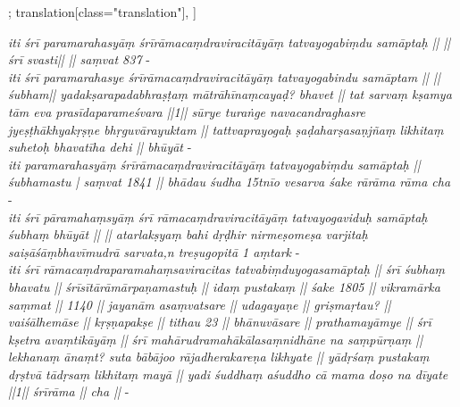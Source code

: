 \begin{alignment}[
  texts=edition[class="edition"];
  translation[class="translation"],
  ]
\begin{edition}
\begin{prose}[p58_05]
{\textit{iti śrī paramarahasyāṃ śrīrāmacaṃdraviracitāyāṃ tatvayogabiṃdu samāptaḥ || || śrī svasti||  || saṃvat 837} - \\

\textit{iti śrī paramarahasye  śrīrāmacaṃdraviracitāyāṃ tatvayogabindu samāptam || || śubham|| yadakṣarapadabhraṣṭaṃ mātrāhīnaṃcayaḍ? bhavet || tat sarvaṃ kṣamya tām eva prasīdaparameśvara ||1|| sūrye turaṅge navacandraghasre jyeṣṭhākhyakṛṣṇe bhṛguvārayuktam || tattvaprayogaḥ ṣaḍaharṣasaṇjñaṃ likhitaṃ suhetoḥ bhavatīha dehi || bhūyāt} - \\

\textit{iti paramarahasyāṃ śrīrāmacaṃdraviracitāyāṃ tatvayogabiṃdu samāptaḥ || śubhamastu | saṃvat 1841 || bhādau śudha 15tnīo vesarva śake rārāma rāma cha} - \\

\textit{iti śrī pāramahaṃsyāṃ śrī rāmacaṃdraviracitāyāṃ tatvayogaviduḥ samāptaḥ śubhaṃ bhūyāt || || atarlakṣyaṃ bahi dṛḍhir nirmeṣomeṣa varjitaḥ saiṣāśāṃbhavīmudrā sarvata,n treṣugopitā 1 aṃtark} - \\

\textit{iti śrī rāmacaṃdraparamahaṃsaviracitas tatvabiṃduyogasamāptaḥ || śrī śubhaṃ bhavatu || śrīsītārāmārpaṇamastuḥ || idaṃ pustakaṃ || śake 1805 || vikramārka saṃmat || 1140 || jayanām asaṃvatsare || udagayaṇe || griṣmaṛtau? || vaiśālhemāse || kṛṣṇapakṣe || tithau 23 || bhānuvāsare || prathamayāmye || śrī kṣetra avaṃtikāyāṃ || śrī mahārudramahākālasaṃnidhāne na saṃpūrṇaṃ || lekhanaṃ ānaṃt? suta bābājoo rājadherakareṇa likhyate || yādṛśaṃ pustakaṃ dṛṣtvā tādṛsaṃ likhitaṃ mayā || yadi śuddhaṃ aśuddho cā mama doṣo na dīyate ||1|| śrīrāma || cha ||} - \\

}
\end{prose}
\end{edition}
\end{alignment}
